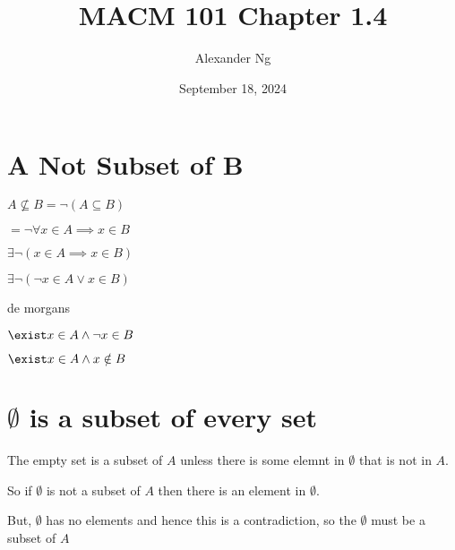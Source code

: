 \documentclass[12pt]{article}
\begin{document}
\title{MACM 101 Chapter 1.4}
\author{Alexander Ng}
\date{September 18, 2024}

\maketitle

\section{A Not Subset of B}

$A \nsubseteq B = \neg(A \subseteq B)$

$= \neg \forall x \in A \implies x \in B$

$\exists \neg (x \in A \implies x \in B)$

$\exists \neg (\neg x \in A \lor x \in B)$

de morgans

$\exist x \in A \land \neg x \in B$

$\exist x \in A \land x \notin B$

\section{$\emptyset$ is a subset of every set}

The empty set is a subset of $A$ unless there is some elemnt in $\emptyset$ 
that is not in $A$.

So if $\emptyset$ is not a subset of $A$ then there is an element in $\emptyset$.

But, $\emptyset$ has no elements and hence this is a contradiction, so the
$\emptyset$ must be a subset of $A$
\end{document}
